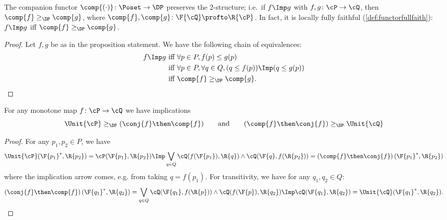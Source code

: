 \begin{example}
\end{example}


\begin{proposition}\label{prop:companion_2}
The companion functor $\comp{(\cdot)}\colon\Poset\to\DP$ preserves the 2-structure; i.e.\ if $f\Imp g$ with $f,g\colon \cP \to\cQ $, then $\comp{f}\geq_\DP\comp{g}$, where $\comp{f},\comp{g}\colon \F{\cQ} \profto\R{\cP}$. In fact, it is locally fully faithful (\cref{def:functorfullfaith}): $f\Imp g$ iff $\comp{f}\geq_\DP \comp{g}$.
\end{proposition}
\begin{proof}
Let $f,g$ be as in the proposition statement. We have the following chain of equivalences:
\begin{equation}
\begin{aligned}
	f\Imp g&\text{ iff }
	\forall p\in P, f(p)\leq g(p)\\&\text{ iff }
	\forall p\in P, \forall q\in Q, (q\leq f(p))\Imp (q\leq g(p))\\&\text{ iff }
	\comp{f}\geq_\DP \comp{g}.
\end{aligned}
\end{equation}
\end{proof}

\begin{proposition}\label{prop:comp_conj_adj}
For any monotone map $f\colon\cP \to\cQ $ we have implications
\begin{equation}
\Unit{\cP }\geq_\DP (\conj{f}\then \comp{f})
\qquad\text{and}\qquad
(\comp{f}\then \conj{f})\geq_\DP \Unit{\cQ }
\end{equation}
\end{proposition}
\begin{proof}
For any $p_1,p_2\in P$, we have
\begin{equation}
	\Unit{\cP }(\F{p_1}^*,\R{p_2})=\cP (\F{p_1},\R{p_2})
	\Imp\bigvee_{q\in Q}\cQ (f(\F{p_1}),\R{q})\wedge\cQ (\F{q},f(\R{p_2}))=\left(\comp{f}\then \conj{f}\right)(\F{p_1}^*,\R{p_2})
\end{equation}
where the implication arrow comes, e.g. from taking $q=f(p_1)$. For transitivity, we have for any $q_1,q_2\in Q$:
\begin{equation}
	\left(\conj{f}\then \comp{f}\right)(\F{q_1}^*,\R{q_2})=\bigvee_{q\in Q}\cQ (\F{q_1},f(\R{p}))\wedge\cQ (f(\F{p}),\R{q_2})
	\Imp\cQ (\F{q_1},\R{q_2})=\Unit{\cQ }(\F{q_1}^*,\R{q_2}).
\end{equation}
\end{proof}

